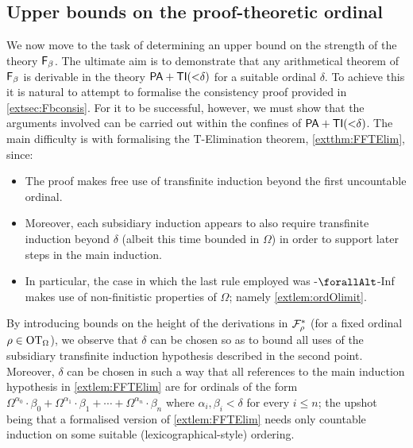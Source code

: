 \documentclass[UKenglish,cleveref,DIV=12]{scrartcl}
\let\forall\forallAlt
\theoremstyle{definition}
\theoremstyle{definition}
\begin{document}
\subsection{Upper bounds on the proof-theoretic ordinal}\label{extsec:Fbupper1}
We now move to the task of determining an upper bound on the strength of the theory
$\mathsf{F}_\beta$. The ultimate aim is to demonstrate that any arithmetical theorem of
$\mathsf{F}_\beta$ is derivable in the theory $\mathsf{PA}+\mathsf{TI}(\mathord<\delta)$ for a suitable
ordinal $\delta$. To achieve this it is natural to attempt to formalise the consistency proof provided in \cref{extsec:Fbconsis}. For it to be successful, however, we must show that the arguments involved can be carried out within the confines of
$\mathsf{PA}+\mathsf{TI}(\mathord<\delta)$. The main difficulty is with formalising the T-Elimination theorem, \cref{extthm:FFTElim}, since:
\begin{itemize}
 \item The proof
  makes free use of transfinite induction beyond the first uncountable ordinal.
 \item Moreover, each subsidiary induction appears to also require transfinite
  induction beyond $\delta$ (albeit this time bounded in $\Omega$) in order to
  support later steps in the main induction.
 \item In particular, the case in which the last rule employed was \textT\eta-$\forall$-Inf
  makes use of non-finitistic properties of $\Omega$; namely
  \cref{extlem:ordOlimit}.
\end{itemize}
By introducing bounds on the height of the derivations in $\mathcal{F}_\rho^*$ (for a fixed ordinal $\rho\in\mathrm{OT}_\Omega$), we observe that $\delta$ can be chosen so as to bound all uses of the subsidiary transfinite induction hypothesis described in the second point.
Moreover, $\delta$ can be
chosen in such a way that all references to the main induction hypothesis in
\cref{extlem:FFTElim} are for ordinals of the form
\linebreak$\Omega^{\alpha_0}\cdot\beta_0+\Omega^{\alpha_1}\cdot\beta_1+\cdots+\Omega^{
\alpha_n}\cdot\beta_n$ where $\alpha_i,\beta_i<\delta$ for every $i\le n$; the
upshot being that a formalised version of \cref{extlem:FFTElim} needs only countable induction on some suitable (lexicographical-style) ordering.
\end{document}
